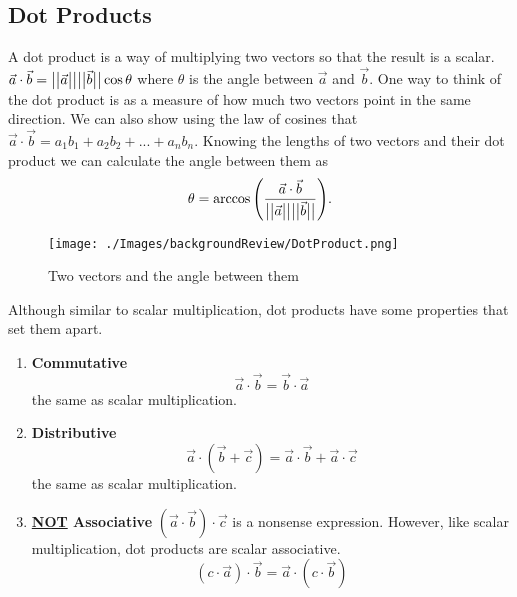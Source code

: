 \subsection{Dot Products}
\noindent
A dot product is a way of multiplying two vectors so that the result is a scalar.
$\vec{a}\cdot\vec{b} = \big\lvert \big\lvert \vec{a} \big\rvert \big\rvert\big\lvert \big\lvert \vec{b} \big\rvert \big\rvert\cos{\theta}$ where $\theta$ is the angle between $\vec{a}$ and $\vec{b}$.
One way to think of the dot product is as a measure of how much two vectors point in the same direction.
We can also show using the law of cosines that $\vec{a}\cdot\vec{b} = a_1b_1+a_2b_2+...+a_nb_n$.
Knowing the lengths of two vectors and their dot product we can calculate the angle between them as
\begin{equation*}
	\theta = \arccos{\left(\frac{\vec{a} \cdot \vec{b}}{\big\lvert \big\lvert \vec{a} \big\rvert \big\rvert \big\lvert \big\lvert \vec{b} \big\rvert \big\rvert}\right)}.
\end{equation*}

\begin{figure}[H]
	\centering
	\texttt{[image: ./Images/backgroundReview/DotProduct.png]}
	\caption{Two vectors and the angle between them}
\end{figure}

\noindent
Although similar to scalar multiplication, dot products have some properties that set them apart.
\begin{enumerate}[label=]
	\item \textbf{Commutative}
		\begin{equation*}
			\vec{a}\cdot\vec{b} = \vec{b}\cdot\vec{a}	
		\end{equation*}
		the same as scalar multiplication.
	\item \textbf{Distributive}
		\begin{equation*}
			\vec{a}\cdot\left(\vec{b}+\vec{c}\right) = \vec{a}\cdot\vec{b}+\vec{a}\cdot\vec{c}
		\end{equation*}
		the same as scalar multiplication.
	\item \textbf{\underline{NOT} Associative}
		$\left(\vec{a}\cdot\vec{b}\right)\cdot\vec{c}$ is a nonsense expression.
		However, like scalar multiplication, dot products are scalar associative.
		\begin{equation*}
			\left(c\cdot\vec{a}\right)\cdot\vec{b} = \vec{a}\cdot\left(c\cdot\vec{b}\right)
		\end{equation*}
\end{enumerate}